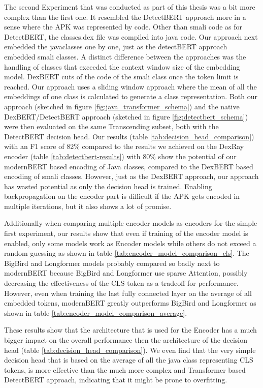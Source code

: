 The second Experiment that was conducted as part of this thesis was a bit more complex than the first one.
It resembled the DetectBERT approach more in a sense where the APK was represented by code.
Other than smali code as for DetectBERT, the classes.dex file was compiled into java code.
Our approach next embedded the javaclasses one by one, just as the detectBERT approach embedded smali classes.
A distinct difference between the approaches was the handling of classes that exceeded the 
context window size of the embedding model.
DexBERT cuts of the code of the smali class once the token limit is reached.
Our approach uses a sliding window approach where the mean of all the embeddings of one class is 
calculated to generate a class representation.
Both our approach (sketched in figure \ref{fig:java_transformer_schema}) and the 
native DexBERT/DetectBERT approach (sketched in figure \ref{fig:detectbert_schema}) were then evaluated on the same
Transcending subset, both with the DetectBERT decision head.
Our results (table \ref{tab:decision_head_comparison}) with an F1 score of 82\% compared to the 
results we achieved on the DexRay encoder (table \ref{tab:detectbert-results}) with 80\% show the 
potential of our modernBERT based encoding of Java classes, compared to the DexBERT based 
encoding of smali classes.
However, just as the DexBERT approach, our approach has wasted potential as only the decision 
head is trained. Enabling backpropagation on the encoder part is difficult if the APK gets 
encoded in multiple iterations, but it also shows a lot of promise.

Additionally when comparing multiple encoder models as encoders for the simple first experiment, 
our results show that even if training of the encoder model is enabled, only some models 
work as Encoder models while others do not exceed a random guessing as shown in table 
\ref{tab:encoder_model_comparison_cls}.
The BigBird and Longformer models probably compared so badly next 
to modernBERT because BigBird and Longformer use sparse Attention, possibly
decreasing the effectiveness of the CLS token as a tradeoff for performance.
However, even when training the last fully connected layer on the average of all embedded tokens, 
modernBERT greatly outperforms BigBird and Longformer as shown in table 
\ref{tab:encoder_model_comparison_average}.

These results show that the architecture that is used for the Encoder has a much bigger 
impact on the overall performance then the architecture of the decision head 
(table \ref{tab:decision_head_comparison}).
We even find that the very simple decision head that is based on the average of all the 
java class representing CLS tokens, is more effective than the much more complex and 
Transformer based DetectBERT approach, indicating that it might be prone to overfitting.


